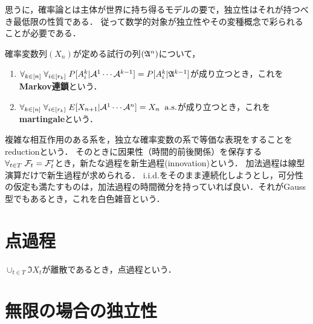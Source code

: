 \documentclass[uplatex,dvipdfmx]{jsreport}
\begin{document}
\begin{tcolorbox}[colframe=ForestGreen, colback=ForestGreen!10!white,breakable,colbacktitle=ForestGreen!40!white,coltitle=black,fonttitle=\bfseries\sffamily,
title=]
    思うに，確率論とは主体が世界に持ち得るモデルの要で，独立性はそれが持つべき最低限の性質である．
    従って数学的対象が独立性やその変種概念で彩られることが必要である．
\end{tcolorbox}

\begin{definition}
    確率変数列$(X_n)$が定める試行の列$(\mathfrak{A}^n)$について，
    \begin{enumerate}
        \item $\forall_{k\in[n]}\;\forall_{i\in[r_k]}\;P[A_i^k|\mathcal{A}^1\cdots\mathcal{A}^{k-1}]=P[A^k_i|\mathfrak{A}^{k-1}]$が成り立つとき，これを\textbf{Markov連鎖}という．
        \item $\forall_{k\in[n]}\;\forall_{i\in[r_k]}\;E[X_{n+1}|\mathcal{A}^1\cdots\mathcal{A}^n]=X_n\;\;\mathrm{a.s.}$が成り立つとき，これを\textbf{martingale}という．
    \end{enumerate}
\end{definition}

\begin{remark}[確率解析の精神]
    複雑な相互作用のある系を，独立な確率変数の系で等価な表現をすることを
    reductionという．
    そのときに因果性（時間的前後関係）を保存する$\forall_{t\in T}\;\mathcal{F}_t=\mathcal{F}'_t$とき，新たな過程を新生過程(innovation)という．
    加法過程は線型演算だけで新生過程が求められる．
    i.i.d.をそのまま連続化しようとし，可分性の仮定も満たすものは，加法過程の時間微分を持っていれば良い．それがGauss型でもあるとき，これを白色雑音という．
\end{remark}

\section{点過程}

\begin{tcolorbox}[colframe=ForestGreen, colback=ForestGreen!10!white,breakable,colbacktitle=ForestGreen!40!white,coltitle=black,fonttitle=\bfseries\sffamily,
title=]
    $\cup_{t\in T}\Im X_t$が離散であるとき，点過程という．
\end{tcolorbox}



\section{無限の場合の独立性}
\end{document}
